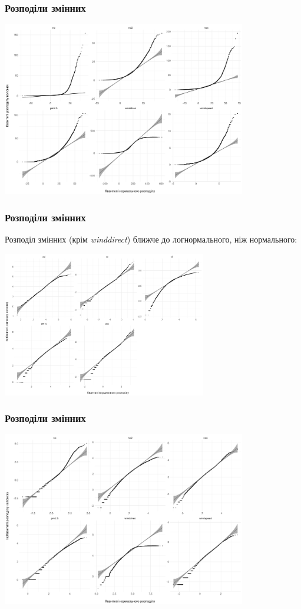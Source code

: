 \documentclass{beamer}
\begin{document}
\begin{frame}
  \frametitle{Розподіли змінних}

  \begin{center}
    \includegraphics[height=3in]{plots/qq_tidy/qq-p2.png}
  \end{center}
\end{frame}

\begin{frame}
  \frametitle{Розподіли змінних}

  Розподіл змінних (крім \textit{winddirect}) ближче до логнормального, ніж нормального:

  \begin{center}
    \includegraphics[height=2.5in]{plots/qq_tidy/qq-log-p1.png}
  \end{center}
\end{frame}

\begin{frame}
  \frametitle{Розподіли змінних}

  \begin{center}
    \includegraphics[height=3in]{plots/qq_tidy/qq-log-p2.png}
  \end{center}
\end{frame}
\end{document}
